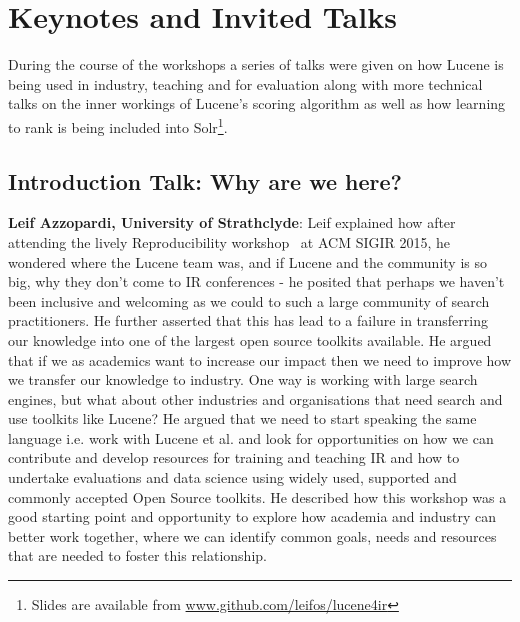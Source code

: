 \section{Keynotes and Invited Talks}
During the course of the workshops a series of talks were given on how Lucene is being used in industry, teaching and for evaluation along with more technical talks on the inner workings of Lucene's scoring algorithm as well as how learning to rank is being included into Solr\footnote{\scriptsize{Slides are available from \url{www.github.com/leifos/lucene4ir}}}. 

\subsection*{Introduction Talk: Why are we here?}
{\bf Leif Azzopardi, University of Strathclyde}:
Leif explained how after attending the lively Reproducibility workshop~\cite{arguello2016repro} at ACM SIGIR 2015, he wondered where the Lucene team was, and if Lucene and the community is so big, why they don't come to IR conferences - he posited that perhaps we haven't been inclusive and welcoming as we could to such a large community of search practitioners. He further asserted that this has lead to a failure in transferring our knowledge into one of the largest open source toolkits available. He argued that if we as academics want to increase our impact then we need to improve how we transfer our knowledge to industry. One way is working with large search engines, but what about other industries and organisations that need search and use toolkits like Lucene? He argued that we need to start speaking the same language i.e. work with Lucene et al. and look for opportunities on how we can contribute and develop resources for training and teaching IR and how to undertake evaluations and data science using widely used, supported and commonly accepted Open Source toolkits. He described how this workshop was a good starting point and opportunity to explore how academia and industry can better work together, where we can identify common goals, needs and resources that are needed to foster this relationship. 
